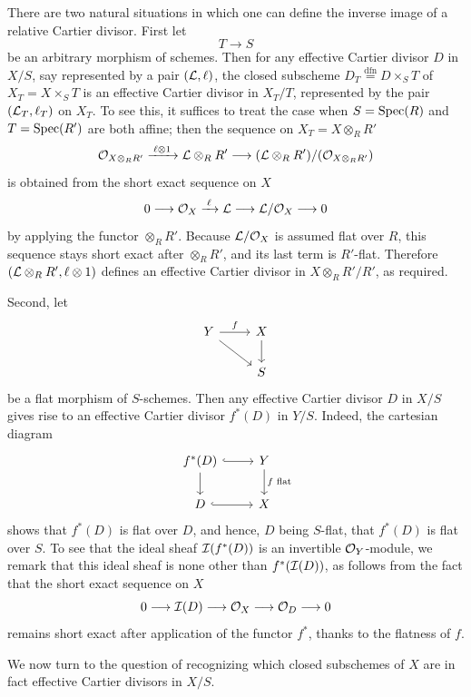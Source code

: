 \kmitem\label{item:1.1.4}
There are two natural situations in which one can define the inverse image of a relative Cartier divisor. First let
\[
T \longrightarrow S
\]
be an arbitrary morphism of schemes. Then for any effective Cartier divisor $D$ in $X/S$, say represented by a pair $(\mathcal{L}, \ell)$, the closed subscheme $D_T \stackrel{\mathrm{dfn}}{=} D \times_S T$ of $X_T = X \times_S T$ is an effective Cartier divisor in $X_T/T$, represented by the pair $(\mathcal{L}_T, \ell_T)$ on $X_T$. To see this, it suffices to treat the case when $S = \operatorname{Spec}(R)$ and $T = \operatorname{Spec}(R')$ are both affine; then the sequence on $X_T = X \otimes_R R'$
\[
\mathcal{O}_{X \otimes_R R'} \xrightarrow{\;\ell \otimes 1\;} \mathcal{L} \otimes_R R' \longrightarrow (\mathcal{L} \otimes_R R')/(\mathcal{O}_{X \otimes_R R'})
\]
is obtained from the short exact sequence on $X$
\[
0 \longrightarrow \mathcal{O}_X \xrightarrow{\;\ell\;} \mathcal{L} \longrightarrow \mathcal{L}/\mathcal{O}_X \longrightarrow 0
\]
by applying the functor $\otimes_R R'$. Because $\mathcal{L}/\mathcal{O}_X$ is assumed flat over $R$, this sequence stays short exact after $\otimes_R R'$, and its last term is $R'$-flat. Therefore $(\mathcal{L} \otimes_R R', \ell \otimes 1)$ defines an effective Cartier divisor in $X \otimes_R R'/R'$, as required.

Second, let
\[
\begin{tikzcd}
Y \arrow[r, "f"] \arrow[rd] & X \arrow[d] \\
& S
\end{tikzcd}
\]
be a flat morphism of $S$-schemes. Then any effective Cartier divisor $D$ in $X/S$ gives rise to an effective Cartier divisor $f^*(D)$ in $Y/S$. Indeed, the cartesian diagram
\[
\begin{tikzcd}
f^*(D) \arrow[r, hook] \arrow[d] & Y \arrow[d, "f\text{ flat}"] \\
D \arrow[r, hook] & X
\end{tikzcd}
\]
shows that $f^*(D)$ is flat over $D$, and hence, $D$ being $S$-flat, that $f^*(D)$ is flat over $S$. To see that the ideal sheaf $\mathcal{I}(f^*(D))$ is an invertible $\mathcal{O}_Y$-module, we remark that this ideal sheaf is none other than $f^*(\mathcal{I}(D))$, as follows from the fact that the short exact sequence on $X$
\[
0 \longrightarrow \mathcal{I}(D) \longrightarrow \mathcal{O}_X \longrightarrow \mathcal{O}_D \longrightarrow 0
\]
remains short exact after application of the functor $f^*$, thanks to the flatness of $f$.

\kmitem\label{item:1.1.5}
We now turn to the question of recognizing which closed subschemes of $X$ are in fact effective Cartier divisors in $X/S$.

